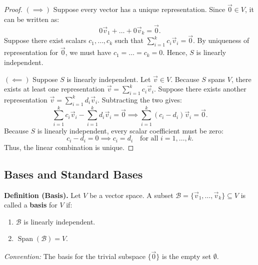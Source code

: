 \begin{proof}
$(\implies)$ Suppose every vector has a unique representation. Since $\vec{0} \in V$, it can be written as:
\[
0\vec{v}_1 + \dots + 0\vec{v}_k = \vec{0}.
\]
Suppose there exist scalars $c_1, \dots, c_k$ such that $\sum_{i=1}^k c_i \vec{v}_i = \vec{0}$. By uniqueness of representation for $\vec{0}$, we must have $c_1 = \dots = c_k = 0$. Hence, $S$ is linearly independent.

$(\impliedby)$ Suppose $S$ is linearly independent. Let $\vec{v} \in V$. Because $S$ spans $V$, there exists at least one representation $\vec{v} = \sum_{i=1}^k c_i \vec{v}_i$. Suppose there exists another representation $\vec{v} = \sum_{i=1}^k d_i \vec{v}_i$. Subtracting the two gives:
\[
\sum_{i=1}^k c_i \vec{v}_i - \sum_{i=1}^k d_i \vec{v}_i = \vec{0} \implies \sum_{i=1}^k (c_i - d_i)\vec{v}_i = \vec{0}.
\]
Because $S$ is linearly independent, every scalar coefficient must be zero:
\[
c_i - d_i = 0 \implies c_i = d_i \quad \text{for all } i = 1, \dots, k.
\]
Thus, the linear combination is unique.
\end{proof}

\subsection{Bases and Standard Bases}

\noindent\textbf{Definition (Basis).} 
Let $V$ be a vector space. A subset $\mathcal{B} = \{\vec{v}_1, \dots, \vec{v}_k\} \subseteq V$ is called a \textbf{basis} for $V$ if:
\begin{enumerate}[itemsep=0.8em, topsep=0.5em]
    \item $\mathcal{B}$ is linearly independent.
    \item $\operatorname{Span}(\mathcal{B}) = V$.
\end{enumerate}
\textit{Convention:} The basis for the trivial subspace $\{\vec{0}\}$ is the empty set $\emptyset$.

